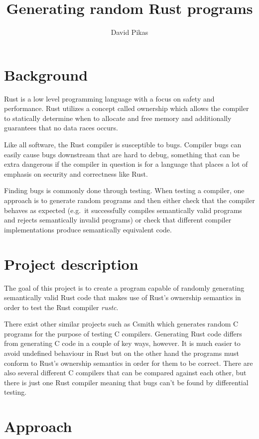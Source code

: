 \documentclass{article}
\author{David Pikas}
\title{Generating random Rust programs}
\begin{document}
\maketitle

\section*{Background}

Rust is a low level programming language with a focus on safety and performance. Rust utilizes a concept called ownership which allows the compiler to statically determine when to allocate and free memory and additionally guarantees that no data races occurs.\cite{rust}

Like all software, the Rust compiler is susceptible to bugs. Compiler bugs can easily cause bugs downstream that are hard to debug, something that can be extra dangerous if the compiler in question is for a language that places a lot of emphasis on security and correctness like Rust.

Finding bugs is commonly done through testing. When testing a compiler, one approach is to generate random programs and then either check that the compiler behaves as expected (e.g.\ it successfully compiles semantically valid programs and rejects semantically invalid programs) or check that different compiler implementations produce semantically equivalent code.

\section*{Project description}

The goal of this project is to create a program capable of randomly generating semantically valid Rust code that makes use of Rust's ownership semantics in order to test the Rust compiler \textit{rustc}.

There exist other similar projects such as Csmith\cite{csmith} which generates random C programs for the purpose of testing C compilers. Generating Rust code differs from generating C code in a couple of key ways, however. It is much easier to avoid undefined behaviour in Rust but on the other hand the programs must conform to Rust's ownership semantics in order for them to be correct. There are also several different C compilers that can be compared against each other, but there is just one Rust compiler meaning that bugs can't be found by differential testing.

\section*{Approach}
\end{document}
